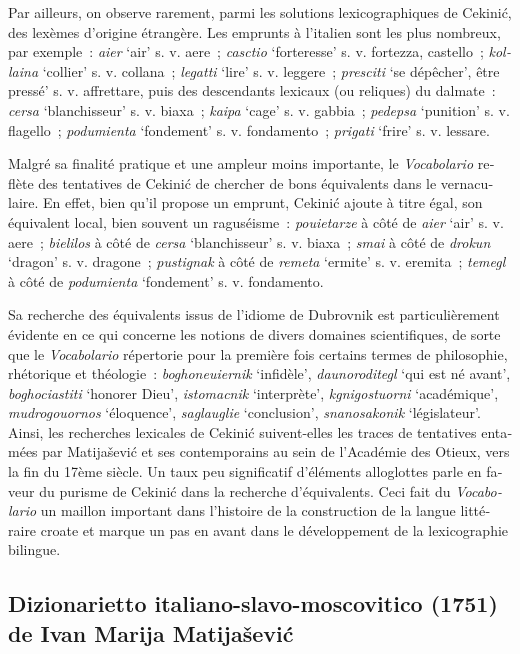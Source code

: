 \documentclass[output=paper,colorlinks,citecolor=brown,arabicfont,chinesefont,booklanguage=french]{langscibook}
\begin{document}
\begin{otherlanguage}{french}
Par ailleurs, on observe rarement, parmi les solutions lexicographiques de Cekinić, des lexèmes d’origine étrangère. Les emprunts à l’italien sont les plus nombreux, par exemple~:  \emph{aier} ‘air’ s. v. aere~; \emph{casctio} ‘forteresse’ s. v. fortezza, castello~; \emph{kollaina} ‘collier’ s. v. collana~; \emph{legatti} ‘lire’ s. v. leggere~; \emph{presciti} ‘se dépêcher’, être pressé’ s. v. affrettare, puis des descendants lexicaux (ou reliques) du dalmate~:  \emph{cersa} ‘blanchisseur’ s. v. biaxa~; \emph{kaipa} ‘cage’ s. v. gabbia~; \emph{pedepsa} ‘punition’ s. v. flagello~; \emph{podumienta} ‘fondement’ s. v. fondamento~; \emph{prigati} ‘frire’ s. v. lessare.

Malgré sa finalité pratique et une ampleur moins importante, le \emph{Vocabolario} reflète des tentatives de Cekinić de chercher de bons équivalents dans le vernaculaire. En effet, bien qu’il propose un emprunt, Cekinić ajoute à titre égal, son équivalent local, bien souvent un raguséisme~:  \emph{pouietarze} à côté de \emph{aier} ‘air’ s. v. aere~; \emph{bielilos} à côté de \emph{cersa} ‘blanchisseur’ s. v. biaxa~; \emph{smai} à côté de \emph{drokun} ‘dragon’ s. v. dragone~; \emph{pustignak} à côté de \emph{remeta} ‘ermite’ s. v. eremita~; \emph{temegl} à côté de \emph{podumienta} ‘fondement’ s. v. fondamento. 

Sa recherche des équivalents issus de l’idiome de Dubrovnik est particulièrement évidente en ce qui concerne les notions de divers domaines scientifiques, de sorte que le \emph{Vocabolario} répertorie pour la première fois certains termes de philosophie, rhétorique et théologie~: \emph{boghoneuiernik} ‘infidèle’, \emph{daunoroditegl} ‘qui est né avant’, \emph{boghociastiti} ‘honorer Dieu’, \emph{istomacnik} ‘interprète’, \emph{kgnigostuorni} ‘académique’, \emph{mudrogouornos} ‘éloquence’, \emph{saglauglie} ‘conclusion’, \emph{snanosakonik} ‘législateur’. Ainsi, les recherches lexicales de Cekinić suivent-elles les traces de tentatives entamées par Matijašević et ses contemporains au sein de l’Académie des Otieux, vers la fin du 17ème siècle. Un taux peu significatif d’éléments alloglottes parle en faveur du purisme de Cekinić dans la recherche d’équivalents. Ceci fait du \emph{Vocabolario} un maillon important dans l’histoire de la construction de la langue littéraire croate et marque un pas en avant dans le développement de la lexicographie bilingue.

\subsection{Dizionarietto italiano-slavo-moscovitico (1751) de Ivan Marija Matijašević}



\end{otherlanguage}
\end{document}
